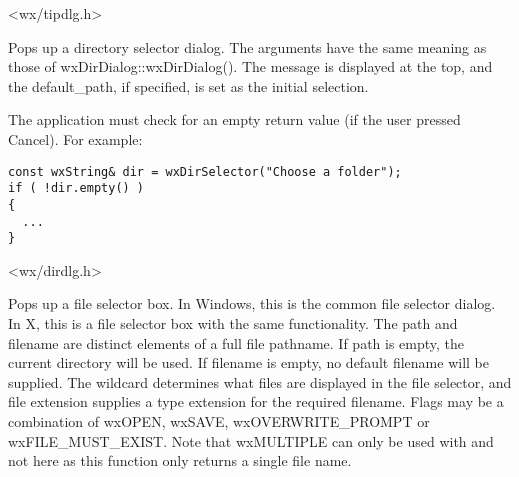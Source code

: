 


<wx/tipdlg.h>


\label{wxdirselector}


Pops up a directory selector dialog. The arguments have the same meaning as
those of wxDirDialog::wxDirDialog(). The message is displayed at the top,
and the default\_path, if specified, is set as the initial selection.

The application must check for an empty return value (if the user pressed
Cancel). For example:

\begin{verbatim}
const wxString& dir = wxDirSelector("Choose a folder");
if ( !dir.empty() )
{
  ...
}
\end{verbatim}


<wx/dirdlg.h>


\label{wxfileselector}


Pops up a file selector box. In Windows, this is the common file selector
dialog. In X, this is a file selector box with the same functionality.
The path and filename are distinct elements of a full file pathname.
If path is empty, the current directory will be used. If filename is empty,
no default filename will be supplied. The wildcard determines what files
are displayed in the file selector, and file extension supplies a type
extension for the required filename. Flags may be a combination of wxOPEN,
wxSAVE, wxOVERWRITE\_PROMPT or wxFILE\_MUST\_EXIST. Note that wxMULTIPLE
can only be used with  and not here as this
function only returns a single file name.

